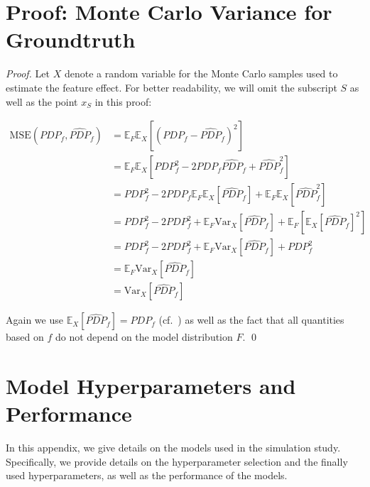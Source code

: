 \documentclass[runningheads]{llncs}
\begin{document}
\section{Proof: Monte Carlo Variance for Groundtruth}\label{app:proof-mc-variance}
\begin{proof}
    Let $X$ denote a random variable for the Monte Carlo samples used to estimate the feature effect.
    For better readability, we will omit the subscript $S$ as well as the point $x_S$ in this proof:

    \begin{align*}
        \text{MSE}(PDP_{f}, \widehat{PDP}_{f}) & = \mathbb{E}_F\mathbb{E}_X[{(PDP_f - \widehat{PDP}_f)}^2]                                                          \\
                                               & = \mathbb{E}_F\mathbb{E}_X[PDP_f^2 - 2PDP_f \widehat{PDP}_f + \widehat{PDP}_f^2]                                   \\
                                               & = PDP_f^2 - 2PDP_f \mathbb{E}_F\mathbb{E}_X[\widehat{PDP}_f] + \mathbb{E}_F\mathbb{E}_X[\widehat{PDP}_f^2]         \\
                                               & = PDP_f^2 - 2PDP_f^2 + \mathbb{E}_F\text{Var}_X[\widehat{PDP}_f] + \mathbb{E}_F[\mathbb{E}_X{[\widehat{PDP}_f]}^2] \\
                                               & = PDP_f^2 - 2PDP_f^2 + \mathbb{E}_F\text{Var}_X[\widehat{PDP}_f] + PDP_f^2                                         \\
                                               & = \mathbb{E}_F\text{Var}_X[\widehat{PDP}_f]                                                                        \\
                                               & = \text{Var}_X[\widehat{PDP}_f]
    \end{align*}

    \noindent Again we use $\mathbb{E}_X[\widehat{PDP}_{f}] = PDP_{f}$ (cf.~\cite{molnar_relating_2023}) as well as the fact
    that all quantities based on $f$ do not depend on the model distribution $F$.
    \qed\
\end{proof}

\section{Model Hyperparameters and Performance}\label{app:model-hps-perf}
In this appendix, we give details on the models used in the simulation study.
Specifically, we provide details on the hyperparameter selection and the
finally used hyperparameters, as well as the performance of the models.
\end{document}
